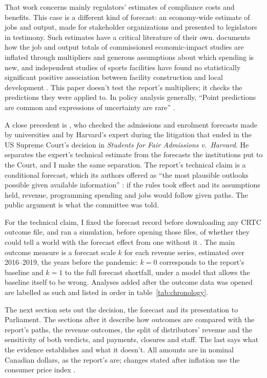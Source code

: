 That work concerns mainly regulators' estimates of compliance costs and benefits. This case is a different kind of forecast: an economy-wide estimate of jobs and output, made for stakeholder organizations and presented to legislators in testimony. Such estimates have a critical literature of their own. \textcite[67]{crompton2006impact} documents how the job and output totals of commissioned economic-impact studies are inflated through multipliers and generous assumptions about which spending is new, and independent studies of sports facilities have found no statistically significant positive association between facility construction and local development \citep[103]{siegfried2000sports}. This paper doesn't test the report's multipliers; it checks the predictions they were applied to. In policy analysis generally, \enquote{Point predictions are common and expressions of uncertainty are rare} \citep[1]{manski2011certitude}.

A close precedent is \textcite{kane2026sffa}, who checked the admissions and enrolment forecasts made by universities and by Harvard's expert during the litigation that ended in the US Supreme Court's decision in \textit{Students for Fair Admissions v.\ Harvard}. He separates the expert's technical estimate from the forecasts the institutions put to the Court, and I make the same separation. The report's technical claim is a conditional forecast, which its authors offered as \enquote{the most plausible outlooks possible given available information} \citep[para.~iii]{nordicity2015television}: if the rules took effect and its assumptions held, revenue, programming spending and jobs would follow given paths. The public argument is what the committee was told.

For the technical claim, I fixed the forecast record before downloading any CRTC outcome file, and ran a simulation, before opening those files, of whether they could tell a world with the forecast effect from one without it \citep{gelman2014types, gelman2020bayesianworkflow}. The main outcome measure is a forecast scale \(k\) for each revenue series, estimated over 2016--2019, the years before the pandemic: \(k=0\) corresponds to the report's baseline and \(k=1\) to the full forecast shortfall, under a model that allows the baseline itself to be wrong. Analyses added after the outcome data was opened are labelled as such and listed in order in table~\ref{tab:chronology}.

The next section sets out the decision, the forecast and its presentation to Parliament. The sections after it describe how outcomes are compared with the report's paths, the revenue outcomes, the split of distributors' revenue and the sensitivity of both verdicts, and payments, closures and staff. The last says what the evidence establishes and what it doesn't. All amounts are in nominal Canadian dollars, as the report's are; changes stated after inflation use the consumer price index \citep{statcan2026cpi}.
